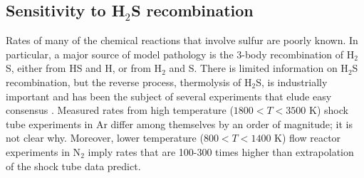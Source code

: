 \documentclass[preprint]{aastex6}
\newcounter{reaction}
\begin{document}
\subsection{Sensitivity to H$_2$S recombination}

Rates of many of the chemical reactions that involve sulfur are poorly known.
In particular, a major source of model pathology 
is the 3-body recombination of H$_2$S, either from HS and H, or from H$_2$ and S. 
%   
There is limited information on H$_2$S recombination,
but the reverse process, thermolysis of H$_2$S, is industrially important and
 has been the subject of several experiments that elude easy consensus
 \citep{Bowman1977,Roth1982,Tesner1990,Woiki1994,Woiki1995a,Olschewski1994,Shiina1996,Shiina1998, 
 Karan1999}.
 Measured rates from high temperature ($1800<T<3500$ K) shock tube experiments in Ar
 \citep{Bowman1977,Woiki1994,Woiki1995a,Olschewski1994,Shiina1996,Shiina1998}
 differ among themselves by an order of magnitude; it is not clear why.
 Moreover, lower temperature ($800 < T < 1400$ K) flow reactor experiments in N$_2$ \citep{Tesner1990,Karan1999}
 imply rates that are 100-300 times higher than extrapolation of the shock tube data predict.
  
\end{document}
